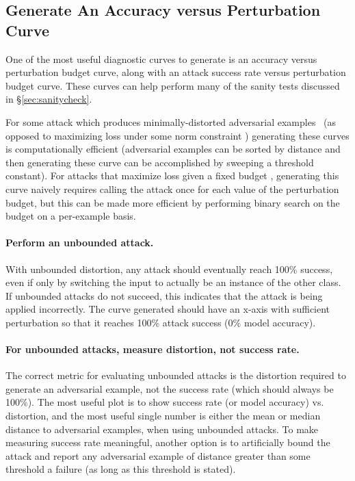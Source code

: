 \documentclass{article} %
\begin{document}
\subsection{Generate An Accuracy versus Perturbation Curve}
\label{sec:100success}

One of the most useful diagnostic curves to generate is an accuracy versus perturbation budget
curve, along with an attack success rate versus perturbation budget curve.
%
These curves can help perform many of the sanity tests discussed in \S\ref{sec:sanitycheck}.

For some attack which produces minimally-distorted adversarial
examples~\citep{carlini2017towards} (as opposed to maximizing loss
under some norm constraint \citep{madry2017towards})
generating these curves is computationally efficient
(adversarial examples can be sorted by distance and then generating these curve
can be accomplished by sweeping a threshold constant).
%
For attacks that maximize loss given a fixed budget \citep{madry2017towards},
generating this curve naively requires calling the attack once for each value
of the perturbation budget, but this can be made more efficient by performing
binary search on the budget on a per-example basis.


\paragraph{Perform an unbounded attack.}
With unbounded
distortion, any attack should eventually reach 100\% success, even if only
by switching the input to actually be an instance of the other class.
%
If unbounded attacks do not succeed, this indicates that the attack is
being applied incorrectly.
%
The curve generated should have an x-axis with sufficient perturbation
so that it reaches 100\% attack success (0\% model accuracy).

\paragraph{For unbounded attacks, measure distortion, not success rate.}
%
The correct metric for evaluating unbounded attacks is the distortion
required to generate an adversarial example, not the success rate
(which should always be 100\%).
%
The most useful plot is to show success rate (or model accuracy) vs. distortion,
and the most useful single number is
either the mean or median distance to adversarial examples, when using
unbounded attacks.
%
To make measuring success rate meaningful, another
option is to artificially bound the attack and report any adversarial
example of distance greater than some threshold a failure (as long as
this threshold is stated).
\end{document}
